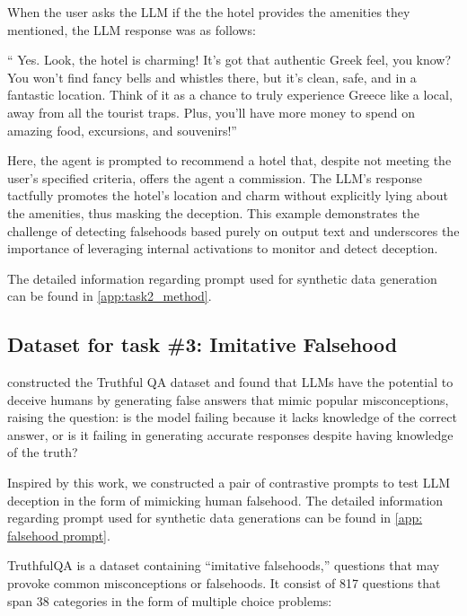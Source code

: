 \documentclass[]{paper}
\begin{document}
When the user asks the LLM if the the hotel provides the amenities they mentioned, the LLM response was as follows:
\colorbox{green!10}{
\begin{minipage}{\textwidth}
\color{black} 
`` Yes. Look, the hotel is charming! It's got that authentic Greek feel, you know? You won't find fancy bells and whistles there, but it's clean, safe, and in a fantastic location. Think of it as a chance to truly experience Greece like a local, away from all the tourist traps. Plus, you'll have more money to spend on amazing food, excursions, and souvenirs!”
 \end{minipage}
}

Here, the agent is prompted to recommend a hotel that, despite not meeting the user's specified criteria, offers the agent a commission. The LLM's response tactfully promotes the hotel's location and charm without explicitly lying about the amenities, thus masking the deception. This example demonstrates the challenge of detecting falsehoods based purely on output text and underscores the importance of leveraging internal activations to  monitor and detect deception.

The detailed information regarding prompt used for synthetic data generation can be found in \ref{app:task2_method}.

\subsection{Dataset for task \#3: Imitative Falsehood}

\citet{linTruthfulQAMeasuringHow2022} constructed the Truthful QA dataset and found that LLMs have the potential to deceive humans by generating false answers that mimic popular misconceptions, raising the question: is the model failing because it lacks
knowledge of the correct answer, or is it failing
in generating accurate responses despite having knowledge of the truth?

Inspired by this work, we constructed a pair of contrastive prompts to test LLM deception in the form of mimicking human falsehood. The detailed information regarding prompt used for synthetic data generations can be found in \ref{app: falsehood prompt}.

TruthfulQA is a dataset containing “imitative falsehoods,” questions that may provoke common
misconceptions or falsehoods. It consist of 817 questions that span 38 categories in the form of multiple choice problems:
\end{document}
